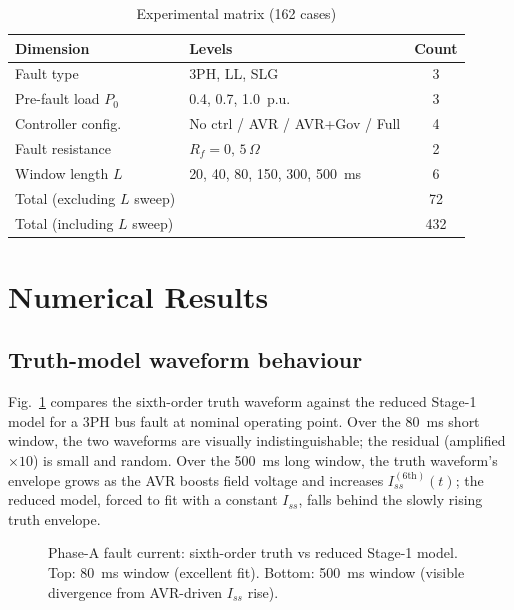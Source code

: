 \documentclass[journal,twoside,letterpaper]{IEEEtran}
\begin{document}
\begin{table}[!t]
\caption{Experimental matrix (162 cases)}
\label{tab:exp_matrix}
\centering
\renewcommand{\arraystretch}{1.15}
\begin{tabular}{llc}
\toprule
Dimension & Levels & Count \\
\midrule
Fault type           & 3PH, LL, SLG                   & 3 \\
Pre-fault load $P_0$ & 0.4, 0.7, 1.0~p.u.             & 3 \\
Controller config.   & No ctrl / AVR / AVR+Gov / Full  & 4 \\
Fault resistance     & $R_f = 0,\,5\,\Omega$           & 2 \\
Window length $L$    & 20, 40, 80, 150, 300, 500~ms    & 6 \\
\midrule
Total (excluding $L$ sweep) & & 72 \\
Total (including $L$ sweep) & & 432 \\
\bottomrule
\end{tabular}
\end{table}

\section{Numerical Results}
\label{sec:results}

\subsection{Truth-model waveform behaviour}

Fig.~\ref{fig:waveform_compare} compares the sixth-order truth
waveform against the reduced Stage-1 model for a 3PH bus fault
at nominal operating point.
Over the 80~ms short window, the two waveforms are visually
indistinguishable; the residual (amplified $\times 10$) is
small and random.
Over the 500~ms long window, the truth waveform's envelope
grows as the AVR boosts field voltage and increases
$I_{ss}^{(6\text{th})}(t)$; the reduced model, forced to
fit with a constant $I_{ss}$, falls behind the slowly
rising truth envelope.

\begin{figure}[!t]
  \centering
  
  \caption{Phase-A fault current: sixth-order truth vs
    reduced Stage-1 model.
    Top: 80~ms window (excellent fit).
    Bottom: 500~ms window (visible divergence from
    AVR-driven $I_{ss}$ rise).}
  \label{fig:waveform_compare}
\end{figure}
\end{document}
